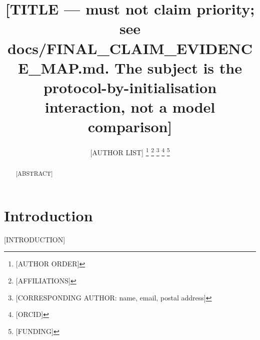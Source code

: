 \documentclass[journal]{IEEEtran}
\begin{document}

\title{[TITLE --- must not claim priority; see
       docs/FINAL\_CLAIM\_EVIDENCE\_MAP.md. The subject is the
       protocol-by-initialisation interaction, not a model comparison]}

\author{[AUTHOR LIST]%
  \thanks{[AUTHOR ORDER]}%
  \thanks{[AFFILIATIONS]}%
  \thanks{[CORRESPONDING AUTHOR: name, email, postal address]}%
  \thanks{[ORCID]}%
  \thanks{[FUNDING]}%
}

\maketitle

\begin{abstract}
%
%
[ABSTRACT]
\end{abstract}

\begin{IEEEkeywords}
\end{IEEEkeywords}

\section{Introduction}
%
%
%
[INTRODUCTION]
\end{document}
